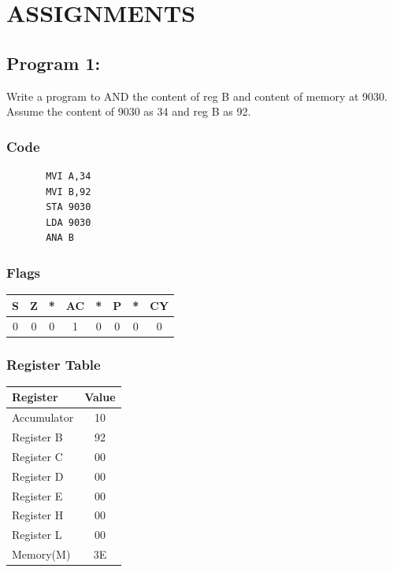 \documentclass[]{report}
\begin{document}
\section*{ASSIGNMENTS}
\subsection*{Program 1: }
Write a program to AND the content of reg B and content of memory at 9030. Assume the content of 9030 as 34 and reg B as 92.
\subsubsection{Code}
\begin{verbatim}
	   MVI A,34
	   MVI B,92
	   STA 9030
	   LDA 9030
	   ANA B
\end{verbatim}
\subsubsection{Flags}
\begin{tabular}{cccccccc}
\hline
    S & Z & *  & AC & *  & P & *  & CY  \\
    \hline
    0&0&0&1&0&0&0&0 \\
    \hline
\end{tabular}
\subsubsection {Register Table}
\begin{tabular}{lc}
    \hline
    Register & Value\\
    \hline
    Accumulator     & 10        \\
    Register B      &  92        \\
    Register C      &  00        \\
    Register D      &   00       \\
    Register E      &   00       \\
    Register H      &  00        \\
    Register L      &  00         \\
    Memory(M)       &      3E         \\
    \hline
\end{tabular}
\end{document}
